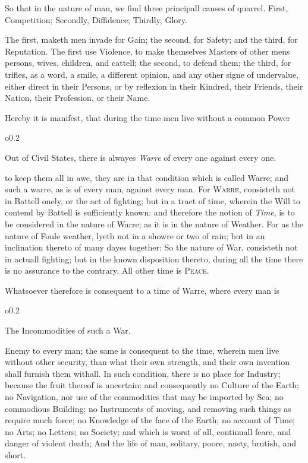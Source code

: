So that in the nature of man, we find three principall causes of
quarrel. First, Competition; Secondly, Diffidence; Thirdly, Glory.

The first, maketh men invade for Gain; the second, for Safety; and the
third, for Reputation. The first use Violence, to make themselves
Masters of other mens persons, wives, children, and cattell; the
second, to defend them; the third, for trifles, as a word, a smile, a
different opinion, and any other signe of undervalue, either direct in
their Persons, or by reflexion in their Kindred, their Friends, their
Nation, their Profession, or their Name.

Hereby it is manifest, that during the time men live without a common
Power \begin{wrapfigure}[5]{o}{0.2\textwidth}\raggedright Out of Civil
States, there is alwayes \emph{Warre} of every one against every one.
\end{wrapfigure} to keep them all in awe, they are in that condition
which is called Warre; and such a warre, as is of every man, against
every man. For \textsc{Warre}, consisteth not in Battell onely, or the
act of fighting; but in a tract of time, wherein the Will to contend
by Battell is sufficiently known: and therefore the  notion
of \textit{Time}, is to be considered in the nature of Warre; as it is
in the nature of Weather. For as the nature of Foule weather, lyeth
not in a showre or two of rain; but in an inclination thereto of many
dayes together: So the nature of War, consisteth not in actuall
fighting; but in the known disposition thereto, during all the time
there is no assurance to the contrary. All other time is
\textsc{Peace}.

Whatsoever therefore is consequent to a time of Warre, where every man
is \begin{wrapfigure}[4]{o}{0.2\textwidth}\raggedright The
Incommodities of such a War. \end{wrapfigure} Enemy to every man; the
same is consequent to the time, wherein men live without other
security, than what their own strength, and their own invention shall
furnish them withall. In such condition, there is no place for
Industry; because the fruit thereof is uncertain: and consequently no
Culture of the Earth; no Navigation, nor use of the commodities that
may be imported by Sea; no commodious Building; no Instruments of
moving, and removing such things as require much force; no Knowledge
of the face of the Earth; no account of Time; no Arts; no Letters; no
Society; and which is worst of all, continuall feare, and danger of
violent death; And the life of man, solitary, poore, nasty, brutish,
and short.

